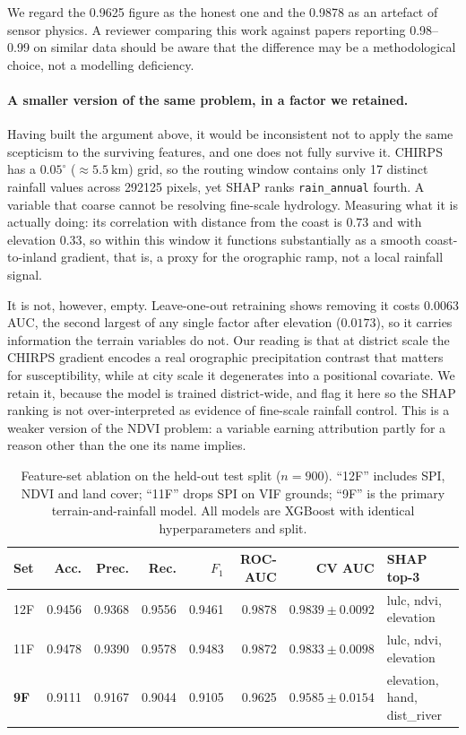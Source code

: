 \documentclass[11pt,a4paper]{article}
\begin{document}
We regard the 0.9625 figure as the honest one and the 0.9878 as an artefact of
sensor physics. A reviewer comparing this work against papers reporting
0.98--0.99 on similar data should be aware that the difference may be a
methodological choice, not a modelling deficiency.

\paragraph{A smaller version of the same problem, in a factor we retained.}
Having built the argument above, it would be inconsistent not to apply the same
scepticism to the surviving features, and one does not fully survive it. CHIRPS
has a $0.05^\circ$ ($\approx\SI{5.5}{\kilo\metre}$) grid, so the routing window
contains only 17 distinct rainfall values across \num{292125} pixels, yet SHAP
ranks \texttt{rain\_annual} fourth. A variable that coarse cannot be resolving
fine-scale hydrology. Measuring what it is actually doing: its correlation with
distance from the coast is $0.73$ and with elevation $0.33$, so within this
window it functions substantially as a smooth coast-to-inland gradient, that is,
a proxy for the orographic ramp, not a local rainfall signal.

It is not, however, empty. Leave-one-out retraining shows removing it costs
$0.0063$ AUC, the second largest of any single factor after elevation
($0.0173$), so it carries information the terrain variables do not. Our reading
is that at district scale the CHIRPS gradient encodes a real orographic
precipitation contrast that matters for susceptibility, while at city scale it
degenerates into a positional covariate. We retain it, because the model is
trained district-wide, and flag it here so the SHAP ranking is not
over-interpreted as evidence of fine-scale rainfall control. This is a weaker
version of the NDVI problem: a variable earning attribution partly for a reason
other than the one its name implies.

\begin{table}[t]
\centering
\caption{Feature-set ablation on the held-out test split ($n=900$). ``12F''
includes SPI, NDVI and land cover; ``11F'' drops SPI on VIF grounds; ``9F'' is
the primary terrain-and-rainfall model. All models are XGBoost with identical
hyperparameters and split.}
\label{tab:ablation}
\small
\begin{tabular}{@{}lrrrrrrl@{}}
\toprule
\textbf{Set} & \textbf{Acc.} & \textbf{Prec.} & \textbf{Rec.} & \textbf{$F_1$} &
\textbf{ROC-AUC} & \textbf{CV AUC} & \textbf{SHAP top-3} \\
\midrule
12F & 0.9456 & 0.9368 & 0.9556 & 0.9461 & 0.9878 & $0.9839\pm0.0092$ & lulc, ndvi, elevation \\
11F & 0.9478 & 0.9390 & 0.9578 & 0.9483 & 0.9872 & $0.9833\pm0.0098$ & lulc, ndvi, elevation \\
\textbf{9F} & 0.9111 & 0.9167 & 0.9044 & 0.9105 & 0.9625 & $0.9585\pm0.0154$ & elevation, hand, dist\_river \\
\bottomrule
\end{tabular}
\end{table}
\end{document}
